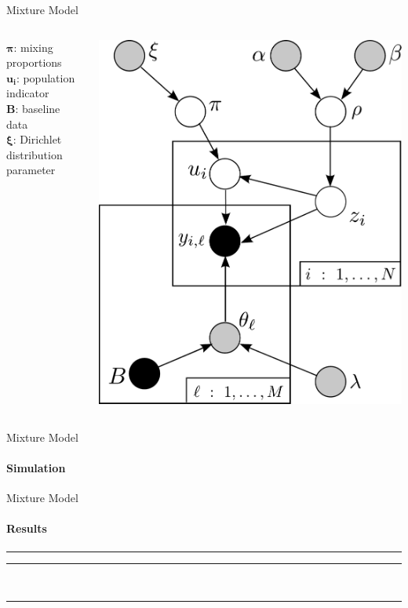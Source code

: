 \documentclass[letter,graphicx]{beamer}
\begin{document}
\begin{frame}{Mixture Model}
\begin{columns}[c]

\column{2in}
$\boldsymbol{\pi}$: mixing proportions \\
\vspace{3mm}
$\boldsymbol{u_i}$: population indicator \\
\vspace{3mm}
$\boldsymbol{B}$: baseline data\\
\vspace{3mm}
$\boldsymbol{\xi}$: Dirichlet distribution parameter

\column{2.25in}
\includegraphics[width=.9\textwidth]{images/DAG_2.pdf}

\end{columns}
\end{frame}

\begin{frame}{Mixture Model}
\framesubtitle{Simulation}
\end{frame}

\begin{frame}{Mixture Model}
\framesubtitle{Results}
\begin{table}
\begin{scriptsize}
\hrule\hrule
\mbox{}\\

\hrule
\end{scriptsize}
\end{table}
\end{frame} 
 
\end{document}
